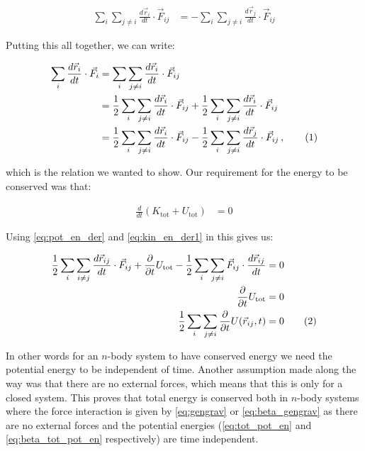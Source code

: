 \documentclass[reprint,english,notitlepage]{revtex4-1}  %
\newcommand\numberthis{\addtocounter{equation}{1}\tag{\theequation}}
\begin{document}
\begin{align*}
\sum\limits_i \sum\limits_{j \neq i} \frac{d\vec{r}_i}{dt} \cdot \vec{F}_{ij} &= -\sum\limits_i \sum\limits_{j \neq i} \frac{d\vec{r}_j}{dt} \cdot \vec{F}_{ij} 
\end{align*}

Putting this all together, we can write:

\begin{align*}
\sum\limits_i \frac{d\vec{r}_i}{dt} \cdot \vec{F}_i &= \sum\limits_i \sum\limits_{j \neq i} \frac{d\vec{r}_i}{dt} \cdot \vec{F}_{ij} \\
&= \frac{1}{2} \sum\limits_i \sum\limits_{j \neq i} \frac{d\vec{r}_i}{dt} \cdot \vec{F}_{ij} + \frac{1}{2} \sum\limits_i \sum\limits_{j \neq i} \frac{d\vec{r}_i}{dt} \cdot \vec{F}_{ij} \\
&= \frac{1}{2} \sum\limits_i \sum\limits_{j \neq i} \frac{d\vec{r}_i}{dt} \cdot \vec{F}_{ij} - \frac{1}{2} \sum\limits_i \sum\limits_{j \neq i} \frac{d\vec{r}_j}{dt} \cdot \vec{F}_{ij} \, , \numberthis \label{eq:pos_force_dot_sum}
\end{align*}

which is the relation we wanted to show. Our requirement for the energy to be conserved was that:

\begin{align*}
\frac{d}{dt}(K_\text{tot} + U_\text{tot}) &= 0
\end{align*}

Using \eqref{eq:pot_en_der} and \eqref{eq:kin_en_der1} in this gives us:

\begin{align*}
\frac{1}{2}\sum\limits_i \sum\limits_{i\neq j} \frac{d\vec{r}_{ij}}{dt} \cdot \vec{F}_{ij} + \frac{\partial}{\partial t} U_\text{tot} - \frac{1}{2}\sum\limits_{i} \sum\limits_{j\neq i} \vec{F}_{ij} \cdot \frac{d\vec{r}_{ij}}{dt} &= 0 \\
\frac{\partial}{\partial t} U_\text{tot} &= 0 \\
\frac{1}{2}\sum\limits_i \sum\limits_{j\neq i } \frac{\partial}{\partial t} U(\vec{r}_{ij},t) &= 0 \numberthis \label{eq:energy_cons}
\end{align*}

In other words for an $n$-body system to have conserved energy we need the potential energy to be independent of time. Another assumption made along the way was that there are no external forces, which means that this is only for a closed system. This proves that total energy is conserved both in $n$-body systems where the force interaction is given by \eqref{eq:gengrav} or \eqref{eq:beta_gengrav} as there are no external forces and the potential energies (\eqref{eq:tot_pot_en} and \eqref{eq:beta_tot_pot_en} respectively) are time independent.
\end{document}
